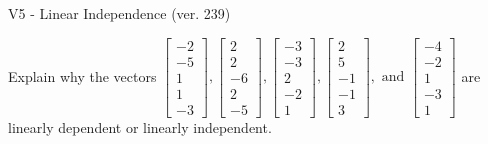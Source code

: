 \begin{exercise}
  \begin{exerciseTitle}V5 - Linear Independence (ver. 239)\end{exerciseTitle}
  \begin{exerciseStatement}
    Explain why the vectors \(\left[\begin{array}{r}
-2 \\
-5 \\
1 \\
1 \\
-3
\end{array}\right] , \left[\begin{array}{r}
2 \\
2 \\
-6 \\
2 \\
-5
\end{array}\right] , \left[\begin{array}{r}
-3 \\
-3 \\
2 \\
-2 \\
1
\end{array}\right] , \left[\begin{array}{r}
2 \\
5 \\
-1 \\
-1 \\
3
\end{array}\right] , \text{ and } \left[\begin{array}{r}
-4 \\
-2 \\
1 \\
-3 \\
1
\end{array}\right]\) are linearly dependent or linearly independent.	



\end{exerciseStatement}
\end{exercise}

